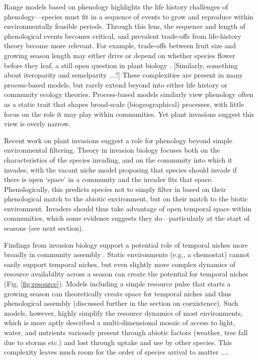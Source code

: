 \documentclass[11pt]{article}
\begin{document}
Range models based on phenology highlights the life history challenges of phenology---species must fit in a sequence of events to grow and reproduce within environmentally feasible periods. Through this lens, the sequence and length of phenological events becomes critical, and prevalent trade-offs from life-history theory become more relevant. For example, trade-offs between fruit size and growing season length may either drive or depend on whether species flower before they leaf, a still open question in plant biology \citep{dan2021nph}. [Similarly, something about iteroparity and semelparity ...?] These complexities are present in many process-based models, but rarely extend beyond into either life history or community ecology theories. Process-based models similarly view phenology often as a static trait that shapes broad-scale (biogeographical) processes, with little focus on the role it may play within communities. Yet plant invasions suggest this view is overly narrow.

Recent work on plant invasions suggest a role for phenology beyond simple environmental filtering. Theory in invasion biology focuses both on the characteristics of the species invading, and on the community into which it invades, with the vacant niche model proposing that species should invade if there is open `space' in a community and the invader fits that space. Phenologically, this predicts species not to simply filter in based on their phenological match to the abiotic environment, but on their match to the biotic environment. Invaders should thus take advantage of open temporal space within communities, which some evidence suggests they do---particularly at the start of seasons (see next section). 

Findings from invasion biology support a potential role of temporal niches more broadly in community assembly \citep{gotelli1996}. Static environments (e.g., a chemostat) cannot easily support temporal niches, but even slightly more complex dynamics of resource availability across a season can create the potential for temporal niches (Fig. \ref{fig:resource}). Models including a simple resource pulse that starts a growing season can theoretically create space for temporal niches and thus phenological assembly (discussed further in the section on coexistence). Such models, however, highly simplify the resource dynamics of most environments, which is more aptly described a multi-dimensional mosaic of access to light, water, and nutrients variously present through abiotic factors (weather, tree fall due to storms etc.) and lost through uptake and use by other species. This complexity leaves much room for the order of species arrival to matter .... 
\end{document}
